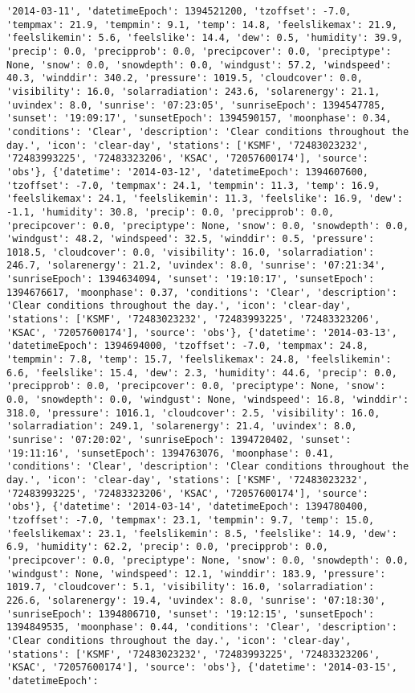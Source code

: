 \documentclass[
  letterpaper,
  DIV=11,
  numbers=noendperiod]{scrartcl}
\begin{document}
\begin{verbatim}
'2014-03-11', 'datetimeEpoch': 1394521200, 'tzoffset': -7.0, 'tempmax': 21.9, 'tempmin': 9.1, 'temp': 14.8, 'feelslikemax': 21.9, 'feelslikemin': 5.6, 'feelslike': 14.4, 'dew': 0.5, 'humidity': 39.9, 'precip': 0.0, 'precipprob': 0.0, 'precipcover': 0.0, 'preciptype': None, 'snow': 0.0, 'snowdepth': 0.0, 'windgust': 57.2, 'windspeed': 40.3, 'winddir': 340.2, 'pressure': 1019.5, 'cloudcover': 0.0, 'visibility': 16.0, 'solarradiation': 243.6, 'solarenergy': 21.1, 'uvindex': 8.0, 'sunrise': '07:23:05', 'sunriseEpoch': 1394547785, 'sunset': '19:09:17', 'sunsetEpoch': 1394590157, 'moonphase': 0.34, 'conditions': 'Clear', 'description': 'Clear conditions throughout the day.', 'icon': 'clear-day', 'stations': ['KSMF', '72483023232', '72483993225', '72483323206', 'KSAC', '72057600174'], 'source': 'obs'}, {'datetime': '2014-03-12', 'datetimeEpoch': 1394607600, 'tzoffset': -7.0, 'tempmax': 24.1, 'tempmin': 11.3, 'temp': 16.9, 'feelslikemax': 24.1, 'feelslikemin': 11.3, 'feelslike': 16.9, 'dew': -1.1, 'humidity': 30.8, 'precip': 0.0, 'precipprob': 0.0, 'precipcover': 0.0, 'preciptype': None, 'snow': 0.0, 'snowdepth': 0.0, 'windgust': 48.2, 'windspeed': 32.5, 'winddir': 0.5, 'pressure': 1018.5, 'cloudcover': 0.0, 'visibility': 16.0, 'solarradiation': 246.7, 'solarenergy': 21.2, 'uvindex': 8.0, 'sunrise': '07:21:34', 'sunriseEpoch': 1394634094, 'sunset': '19:10:17', 'sunsetEpoch': 1394676617, 'moonphase': 0.37, 'conditions': 'Clear', 'description': 'Clear conditions throughout the day.', 'icon': 'clear-day', 'stations': ['KSMF', '72483023232', '72483993225', '72483323206', 'KSAC', '72057600174'], 'source': 'obs'}, {'datetime': '2014-03-13', 'datetimeEpoch': 1394694000, 'tzoffset': -7.0, 'tempmax': 24.8, 'tempmin': 7.8, 'temp': 15.7, 'feelslikemax': 24.8, 'feelslikemin': 6.6, 'feelslike': 15.4, 'dew': 2.3, 'humidity': 44.6, 'precip': 0.0, 'precipprob': 0.0, 'precipcover': 0.0, 'preciptype': None, 'snow': 0.0, 'snowdepth': 0.0, 'windgust': None, 'windspeed': 16.8, 'winddir': 318.0, 'pressure': 1016.1, 'cloudcover': 2.5, 'visibility': 16.0, 'solarradiation': 249.1, 'solarenergy': 21.4, 'uvindex': 8.0, 'sunrise': '07:20:02', 'sunriseEpoch': 1394720402, 'sunset': '19:11:16', 'sunsetEpoch': 1394763076, 'moonphase': 0.41, 'conditions': 'Clear', 'description': 'Clear conditions throughout the day.', 'icon': 'clear-day', 'stations': ['KSMF', '72483023232', '72483993225', '72483323206', 'KSAC', '72057600174'], 'source': 'obs'}, {'datetime': '2014-03-14', 'datetimeEpoch': 1394780400, 'tzoffset': -7.0, 'tempmax': 23.1, 'tempmin': 9.7, 'temp': 15.0, 'feelslikemax': 23.1, 'feelslikemin': 8.5, 'feelslike': 14.9, 'dew': 6.9, 'humidity': 62.2, 'precip': 0.0, 'precipprob': 0.0, 'precipcover': 0.0, 'preciptype': None, 'snow': 0.0, 'snowdepth': 0.0, 'windgust': None, 'windspeed': 12.1, 'winddir': 183.9, 'pressure': 1019.7, 'cloudcover': 5.1, 'visibility': 16.0, 'solarradiation': 226.6, 'solarenergy': 19.4, 'uvindex': 8.0, 'sunrise': '07:18:30', 'sunriseEpoch': 1394806710, 'sunset': '19:12:15', 'sunsetEpoch': 1394849535, 'moonphase': 0.44, 'conditions': 'Clear', 'description': 'Clear conditions throughout the day.', 'icon': 'clear-day', 'stations': ['KSMF', '72483023232', '72483993225', '72483323206', 'KSAC', '72057600174'], 'source': 'obs'}, {'datetime': '2014-03-15', 'datetimeEpoch': 
\end{verbatim}
\end{document}
